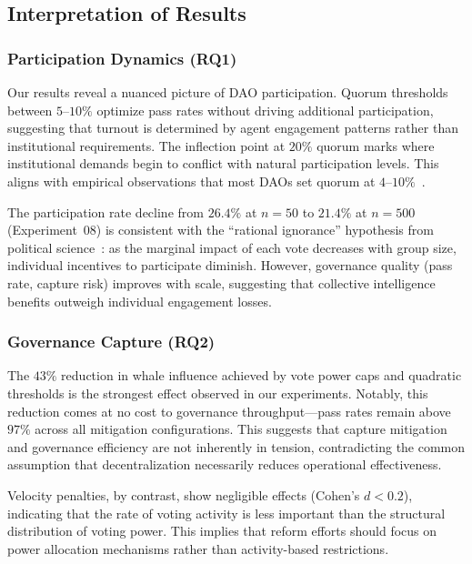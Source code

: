 
\subsection{Interpretation of Results}

\subsubsection{Participation Dynamics (RQ1)}

Our results reveal a nuanced picture of DAO participation. Quorum thresholds between $5$--$10\%$ optimize pass rates without driving additional participation, suggesting that turnout is determined by agent engagement patterns rather than institutional requirements. The inflection point at $20\%$ quorum marks where institutional demands begin to conflict with natural participation levels. This aligns with empirical observations that most DAOs set quorum at $4$--$10\%$~\citep{barbereau2022dao}.

The participation rate decline from $26.4\%$ at $n=50$ to $21.4\%$ at $n=500$ (Experiment~08) is consistent with the ``rational ignorance'' hypothesis from political science~\citep{downs1957economic}: as the marginal impact of each vote decreases with group size, individual incentives to participate diminish. However, governance quality (pass rate, capture risk) improves with scale, suggesting that collective intelligence benefits outweigh individual engagement losses.

\subsubsection{Governance Capture (RQ2)}

The $43\%$ reduction in whale influence achieved by vote power caps and quadratic thresholds is the strongest effect observed in our experiments. Notably, this reduction comes at no cost to governance throughput---pass rates remain above $97\%$ across all mitigation configurations. This suggests that capture mitigation and governance efficiency are not inherently in tension, contradicting the common assumption that decentralization necessarily reduces operational effectiveness.

Velocity penalties, by contrast, show negligible effects (Cohen's $d < 0.2$), indicating that the rate of voting activity is less important than the structural distribution of voting power. This implies that reform efforts should focus on power allocation mechanisms rather than activity-based restrictions.

